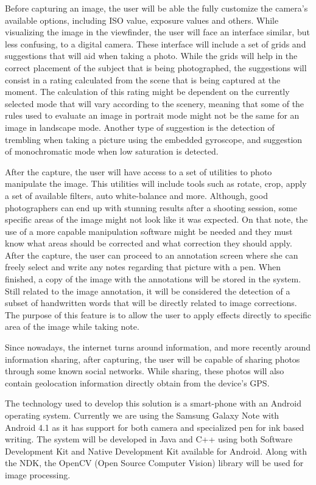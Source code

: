 Before capturing an image, the user will be able the fully customize the camera's available options, including ISO value, exposure values and others. While visualizing the image in the viewfinder, the user will face an interface similar, but less confusing, to a digital camera. 
These interface will include a set of grids and suggestions that will aid when taking a photo. While the grids will help in the correct placement of the subject that is being photographed, the suggestions will consist in a rating calculated from the scene that is being captured at the moment. 
The calculation of this rating might be dependent on the currently selected mode that will vary according to the scenery, meaning that some of the rules used to evaluate an image in portrait mode might not be the same for an image in landscape mode. Another type of suggestion is the detection of trembling when taking a picture using the embedded gyroscope, and suggestion of monochromatic mode when low saturation is detected.

After the capture, the user will have access to a set of utilities to photo manipulate the image. This utilities will include tools such as rotate, crop, apply a set of available filters, auto white-balance and  more.
Although, good photographers can end up with stunning results after a shooting session, some specific areas of the image might not look like it was expected. On that note, the use of a more capable manipulation software might be needed and they must know what areas should be corrected and what correction they should apply. After the capture, the user can proceed to an annotation screen where she can freely select and write any notes regarding that picture with a pen. When finished, a copy of the image with the annotations will be stored in the system. Still related to the image annotation, it will be considered the detection of a subset of handwritten words that will be directly related to image corrections. The purpose of this feature is to allow the user to apply effects directly to specific area of the image while taking note.

Since nowadays, the internet turns around information, and more recently around information sharing, after capturing, the user will be capable of sharing photos through some known social networks. While sharing, these photos will also contain geolocation information directly obtain from the device's GPS.

The technology used to develop this solution is a smart-phone with an Android operating system. Currently we are using the Samsung Galaxy Note with Android 4.1 as it has support for both camera and specialized pen for ink based writing. The system will be developed in Java and C++ using both Software Development Kit \cite{SDK} and Native Development Kit \cite{NDK} available for Android.  Along with the NDK, the OpenCV (Open Source Computer Vision) \cite{OCV} library will be used for image processing.

